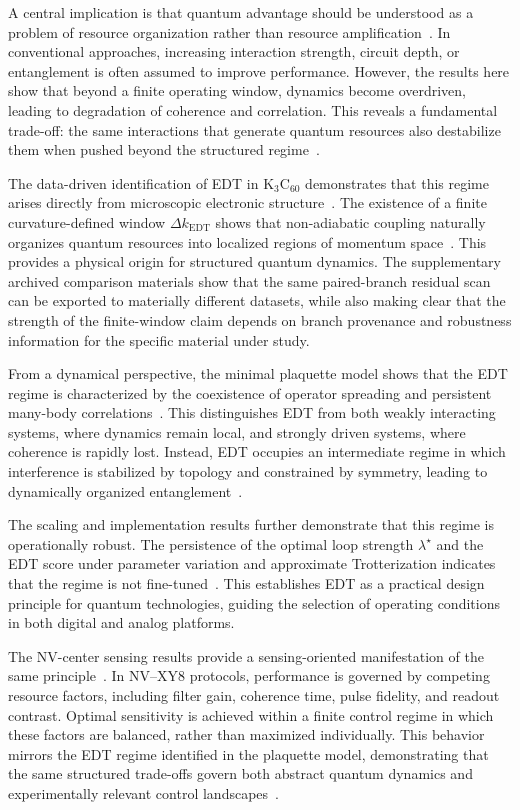 \documentclass[twocolumn,10pt]{article}
\begin{document}
A central implication is that quantum advantage should be understood as a problem of resource organization rather than resource amplification~\cite{Preskill2018}. In conventional approaches, increasing interaction strength, circuit depth, or entanglement is often assumed to improve performance. However, the results here show that beyond a finite operating window, dynamics become overdriven, leading to degradation of coherence and correlation. This reveals a fundamental trade-off: the same interactions that generate quantum resources also destabilize them when pushed beyond the structured regime~\cite{Altman2015,Swingle2018}.

The data-driven identification of EDT in K$_3$C$_{60}$ demonstrates that this regime arises directly from microscopic electronic structure~\cite{Gunnarsson1997,Capone2009}. The existence of a finite curvature-defined window $\Delta k_{\mathrm{EDT}}$ shows that non-adiabatic coupling naturally organizes quantum resources into localized regions of momentum space~\cite{Mead1979,Yarkony1996}. This provides a physical origin for structured quantum dynamics. The supplementary archived comparison materials show that the same paired-branch residual scan can be exported to materially different datasets, while also making clear that the strength of the finite-window claim depends on branch provenance and robustness information for the specific material under study.

From a dynamical perspective, the minimal plaquette model shows that the EDT regime is characterized by the coexistence of operator spreading and persistent many-body correlations~\cite{Choi2016,KimHuse2013}. This distinguishes EDT from both weakly interacting systems, where dynamics remain local, and strongly driven systems, where coherence is rapidly lost. Instead, EDT occupies an intermediate regime in which interference is stabilized by topology and constrained by symmetry, leading to dynamically organized entanglement~\cite{Swingle2018}.

The scaling and implementation results further demonstrate that this regime is operationally robust. The persistence of the optimal loop strength $\lambda^\star$ and the EDT score under parameter variation and approximate Trotterization indicates that the regime is not fine-tuned~\cite{Lloyd1996,Childs2019}. This establishes EDT as a practical design principle for quantum technologies, guiding the selection of operating conditions in both digital and analog platforms.

The NV-center sensing results provide a sensing-oriented manifestation of the same principle~\cite{Degen2017,Barry2020}. In NV--XY8 protocols, performance is governed by competing resource factors, including filter gain, coherence time, pulse fidelity, and readout contrast. Optimal sensitivity is achieved within a finite control regime in which these factors are balanced, rather than maximized individually. This behavior mirrors the EDT regime identified in the plaquette model, demonstrating that the same structured trade-offs govern both abstract quantum dynamics and experimentally relevant control landscapes~\cite{Casola2018}.
\end{document}
